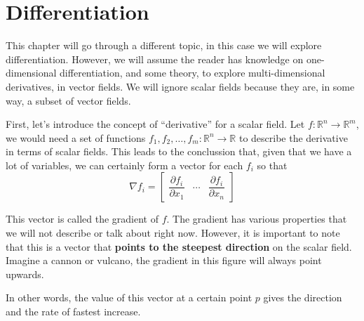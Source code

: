 \documentclass[../linear-spaces.tex]{subfiles}
\begin{document}
\chapter{Differentiation}

This chapter will go through a different topic, in this case we will explore differentiation.
However, we will assume the reader has knowledge on one-dimensional differentiation, and some
theory, to explore multi-dimensional derivatives, in vector fields. We will ignore scalar fields 
because they are, in some way, a subset of vector fields.

First, let's introduce the concept of ``derivative'' for a scalar field. Let $f: \mathbb{R}^{n} \to \mathbb{R}^{m}$,
we would need a set of functions $f_1,f_2,\dots,f_m: \mathbb{R}^{n} \to \mathbb{R}$ to describe the 
derivative in terms of scalar fields. This leads to the conclussion that, given that we have a lot of variables, we 
can certainly form a vector for each $f_i$ so that 
\begin{equation*}
    \nabla f_i = 
    \begin{bmatrix} 
        \dfrac{\partial f_i}{\partial x_1} & \cdots & \dfrac{\partial f_i}{\partial x_n} 
    \end{bmatrix}
\end{equation*}

This vector is called the gradient of $f$. The gradient has various properties that we will not describe or talk about right now. 
However, it is important to note that this is a vector that \textbf{points to the steepest direction} on the scalar field. Imagine 
a cannon or vulcano, the gradient in this figure will always point upwards.

In other words, the value of this vector at a certain point $p$ gives the direction and the rate of fastest increase.
\end{document}
